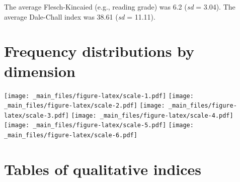 \documentclass[
]{book}
\begin{document}
The average Flesch-Kincaied (e.g., reading grade) was 6.2 (\emph{sd} = 3.04). The average Dale-Chall index was 38.61 (\emph{sd} = 11.11).

\hypertarget{frequency-distributions-by-dimension}{%
\section{Frequency distributions by dimension}\label{frequency-distributions-by-dimension}}

\texttt{[image: \_main\_files/figure-latex/scale-1.pdf]} \texttt{[image: \_main\_files/figure-latex/scale-2.pdf]} \texttt{[image: \_main\_files/figure-latex/scale-3.pdf]} \texttt{[image: \_main\_files/figure-latex/scale-4.pdf]} \texttt{[image: \_main\_files/figure-latex/scale-5.pdf]} \texttt{[image: \_main\_files/figure-latex/scale-6.pdf]}

\hypertarget{tables-of-qualitative-indices}{%
\section{Tables of qualitative indices}\label{tables-of-qualitative-indices}}
\end{document}
